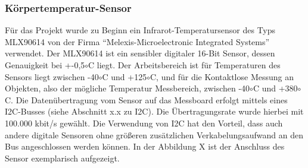 \subsubsection{K{\"o}rpertemperatur-Sensor} \label{grund-temp-subsubsec}


Für das Projekt wurde zu Beginn ein Infrarot-Temperatursensor des Typs MLX90614 von der Firma ``Melexis-Microelectronic Integrated Systems'' verwendet. 
Der MLX90614 ist ein sensibler digitaler  16-Bit Sensor, dessen Genauigkeit bei +-0,5$\circ$C liegt. 
Der Arbeitsbereich ist für Temperaturen des Sensors liegt zwischen -40$\circ$C und +125$\circ$C, und für die Kontaktlose Messung an Objekten, also der mögliche Temperatur Messbereich, zwischen -40$\circ$C und +380$\circ$C. 
Die Datenübertragung vom Sensor auf das Messboard erfolgt mittels eines I2C-Busses (siehe Abschnitt x.x zu I2C). 
Die Übertragungsrate wurde hierbei mit 100.000 kbit/s gewählt. 
Die Verwendung von I2C hat den Vorteil, dass auch andere digitale Sensoren ohne größeren zusätzlichen Verkabelungsaufwand an den Bus angeschlossen werden können. 
In der Abbildung X ist der Anschluss des Sensor exemplarisch aufgezeigt.
